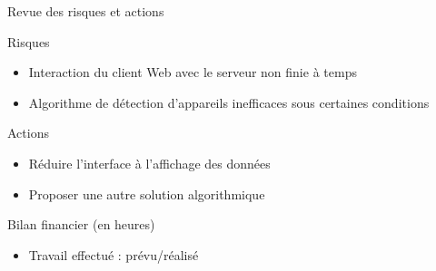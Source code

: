 \documentclass{beamer}
\begin{document}
\begin{frame}{Revue des risques et actions}
 \begin{alertblock}{Risques} %
  \begin{itemize}
  \item Interaction du client Web avec le serveur non finie à temps
  \item Algorithme de détection d'appareils inefficaces sous certaines conditions
  \end{itemize}
  \end{alertblock}
 \vspace{10pt}
 \begin{exampleblock}{Actions} %
  \begin{itemize}
  \item Réduire l'interface à l'affichage des données
  \item Proposer une autre solution algorithmique
  \end{itemize}
  \end{exampleblock}
\end{frame}
\begin{frame}{Bilan financier (en heures)}
  \begin{itemize}
  \item Travail effectué : prévu/réalisé  
  \end{itemize}
\end{frame}


 
\end{document}
